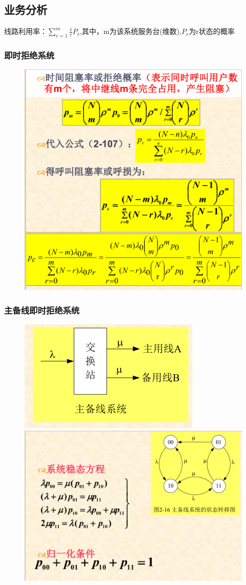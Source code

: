 \documentclass{article}
\begin{document}
	\subsection{业务分析}
	线路利用率：\( \sum_{r=1}^{m}\frac{1}{r}P_r  \),其中，m为该系统服务台(维数),$P_r$为r状态的概率
	\subsubsection{即时拒绝系统}
	\begin{figure}[H]
		\centering
		\includegraphics[width=0.5\linewidth]{figures/prove_7}
		\caption{}
		\label{fig:prove7}
	\end{figure}
	\subsubsection{主备线即时拒绝系统}
	\begin{figure}[H]
		\centering	
			\includegraphics[width=0.4\linewidth]{figures/prove_12}
			\\	\includegraphics[width=0.5\linewidth]{figures/prove_8}
	
		\caption{}
		\label{fig:prove8}
	\end{figure}
\end{document}
